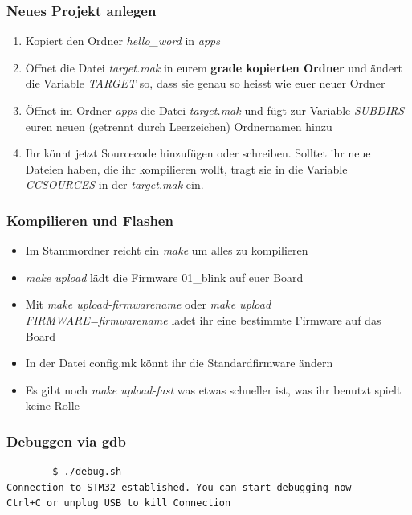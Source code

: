 \documentclass[ngerman,compress]{beamer}
\begin{document}
\begin{frame}
	\frametitle{Neues Projekt anlegen}
	\begin{enumerate}
		\item Kopiert den Ordner \emph{hello\_word} in \emph{apps}
		\item Öffnet die Datei \emph{target.mak} in eurem \textbf{grade kopierten Ordner} und ändert die Variable \emph{TARGET} so, dass sie genau so heisst wie euer neuer Ordner
		\item Öffnet im Ordner \emph{apps} die Datei \emph{target.mak} und fügt zur Variable \emph{SUBDIRS} euren neuen (getrennt durch Leerzeichen) Ordnernamen hinzu
		\item Ihr könnt jetzt Sourcecode hinzufügen oder schreiben. Solltet ihr neue Dateien haben, die ihr kompilieren wollt, tragt sie in die Variable \emph{CCSOURCES} in der \emph{target.mak} ein.
	\end{enumerate}
\end{frame}

\begin{frame}
	\frametitle{Kompilieren und Flashen}
	\begin{itemize}
		\item Im Stammordner reicht ein \emph{make} um alles zu kompilieren
		\item \emph{make upload} lädt die Firmware 01\_blink auf euer Board
		\item Mit \emph{make upload-firmwarename} oder \emph{make upload FIRMWARE=firmwarename} ladet ihr eine bestimmte Firmware auf das Board
		\item In der Datei config.mk könnt ihr die Standardfirmware ändern
		\item Es gibt noch \emph{make upload-fast} was etwas schneller ist, was ihr benutzt spielt keine Rolle
	\end{itemize}
\end{frame}

\begin{frame} [fragile]
	\frametitle{Debuggen via gdb}
		\begin{lstlisting}
		$ ./debug.sh 
Connection to STM32 established. You can start debugging now
Ctrl+C or unplug USB to kill Connection 
		\end{lstlisting}
\end{frame}
\end{document}
